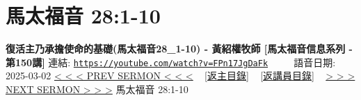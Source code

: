 \documentclass{book}
\begin{document}
\section{馬太福音 28:1-10}
\label{sec:FPn17JgDaFk}
\textbf{復活主乃承擔使命的基礎(馬太福音28\_1-10) - 黃紹權牧師  [馬太福音信息系列 - 第150講]}
\newline
\newline
連結: \href{https://youtube.com/watch?v=FPn17JgDaFk}{\texttt{https://youtube.com/watch?v=FPn17JgDaFk}} ~~~~ 語音日期: 2025-03-02
\newline
\newline
\hyperref[sec:XsHcQyRDgsU]{< < < PREV SERMON < < <}
~
\hyperlink{toc}{[返主目錄]}
~
\hyperref[ch:preacher18]{[返講員目錄]}
~
\hyperref[sec:zNZ0_TjZo3U]{> > > NEXT SERMON > > >}
\newline
\newline
馬太福音 28:1-10
\newline
\end{document}
